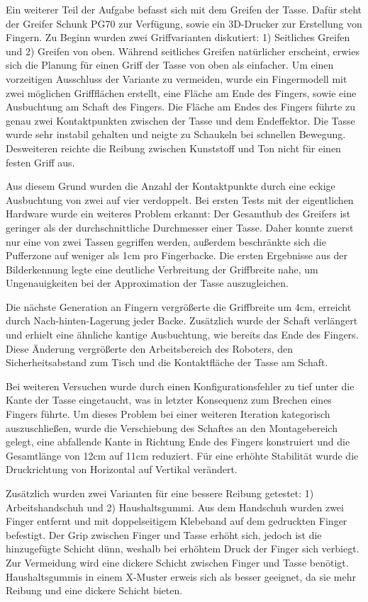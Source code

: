 Ein weiterer Teil der Aufgabe befasst sich mit dem Greifen der Tasse. Dafür steht der Greifer Schunk PG70 zur Verfügung, sowie ein 3D-Drucker zur Erstellung von Fingern. Zu Beginn wurden zwei Griffvarianten diskutiert: 1) Seitliches Greifen und 2) Greifen von oben. Während seitliches Greifen natürlicher erscheint, erwies sich die Planung für einen Griff der Tasse von oben als einfacher. Um einen vorzeitigen Ausschluss der Variante zu vermeiden, wurde ein Fingermodell mit zwei möglichen Griffflächen erstellt, eine Fläche am Ende des Fingers, sowie eine Ausbuchtung am Schaft des Fingers. Die Fläche am Endes des Fingers führte zu genau zwei Kontaktpunkten zwischen der Tasse und dem Endeffektor. Die Tasse wurde sehr instabil gehalten und neigte zu Schaukeln bei schnellen Bewegung. Desweiteren reichte die Reibung zwischen Kunststoff und Ton nicht für einen festen Griff aus.

Aus diesem Grund wurden die Anzahl der Kontaktpunkte durch eine eckige Ausbuchtung von zwei auf vier verdoppelt. Bei ersten Tests mit der eigentlichen Hardware wurde ein weiteres Problem erkannt: Der Gesamthub des Greifers ist geringer als der durchschnittliche Durchmesser einer Tasse. Daher konnte zuerst nur eine von zwei Tassen gegriffen werden, außerdem beschränkte sich die Pufferzone auf weniger als 1cm pro Fingerbacke. Die ersten Ergebnisse aus der Bilderkennung legte eine deutliche Verbreitung der Griffbreite nahe, um Ungenauigkeiten bei der Approximation der Tasse auszugleichen.

Die nächste Generation an Fingern vergrößerte die Griffbreite um 4cm, erreicht durch \glqq Nach-hinten\grqq -Lagerung jeder Backe. Zusätzlich wurde der Schaft verlängert und erhielt eine ähnliche kantige Ausbuchtung, wie bereits das Ende des Fingers. Diese Änderung vergrößerte den Arbeitsbereich des Roboters, den Sicherheitsabstand zum Tisch und die Kontaktfläche der Tasse am Schaft.

Bei weiteren Versuchen wurde durch einen Konfigurationsfehler zu tief unter die Kante der Tasse eingetaucht, was in letzter Konsequenz zum Brechen eines Fingers führte. Um dieses Problem bei einer weiteren Iteration kategorisch auszuschließen, wurde die Verschiebung des Schaftes an den Montagebereich gelegt, eine abfallende Kante in Richtung Ende des Fingers konstruiert und die Gesamtlänge von 12cm auf 11cm reduziert. Für eine erhöhte Stabilität wurde die Druckrichtung von Horizontal auf Vertikal verändert.

Zusätzlich wurden zwei Varianten für eine bessere Reibung getestet: 1) Arbeitshandschuh und 2) Haushaltsgummi. Aus dem Handschuh wurden zwei Finger entfernt und mit doppelseitigem Klebeband auf dem gedruckten Finger befestigt. Der Grip zwischen Finger und Tasse erhöht sich, jedoch ist die hinzugefügte Schicht dünn, weshalb bei erhöhtem Druck der Finger sich verbiegt. Zur Vermeidung wird eine dickere Schicht zwischen Finger und Tasse benötigt. Haushaltsgummis in einem X-Muster erweis sich als besser geeignet, da sie mehr Reibung und eine dickere Schicht bieten.


